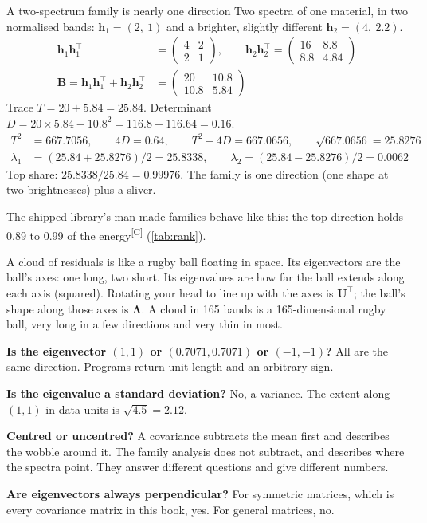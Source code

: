 \documentclass[11pt,a4paper,oneside,openany]{book}
\newcommand{\B}[1]{{\symbf{#1}}}
\newcommand{\B}[1]{{\bm{#1}}}
\newcommand{\comp}{\textsuperscript{\textsf{\scriptsize[C]}}}
\newcommand{\T}{^{\top}}
\newcommand{\vh}{\B{h}}
\newcommand{\mU}{\B{U}}
\newcommand{\mB}{\B{B}}
\newcommand{\mLam}{\B{\Lambda}}
\begin{document}
\begin{worked}[label=we:family]{A two-spectrum family is nearly one direction}
Two spectra of one material, in two normalised bands: $\vh_1=(2,\ 1)$ and a brighter, slightly different
$\vh_2=(4,\ 2.2)$.
\begin{align*}
\vh_1\vh_1\T &= \begin{pmatrix}4&2\\2&1\end{pmatrix},\qquad
\vh_2\vh_2\T = \begin{pmatrix}16&8.8\\8.8&4.84\end{pmatrix}\\
\mB=\vh_1\vh_1\T+\vh_2\vh_2\T &= \begin{pmatrix}20&10.8\\10.8&5.84\end{pmatrix}
\end{align*}
Trace $T=20+5.84=25.84$. Determinant $D=20\times5.84-10.8^2=116.8-116.64=0.16$.
\begin{align*}
T^2 &= 667.7056,\qquad 4D=0.64,\qquad T^2-4D=667.0656,\qquad \sqrt{667.0656}=25.8276\\
\lambda_1 &= (25.84+25.8276)/2=25.8338,\qquad \lambda_2=(25.84-25.8276)/2=0.0062
\end{align*}
Top share: $25.8338/25.84=0.99976$. The family is one direction (one shape at two brightnesses) plus a sliver.
\end{worked}

The shipped library's man-made families behave like this: the top direction holds 0.89 to 0.99 of the energy\comp
(\cref{tab:rank}).

\begin{analogy}
A cloud of residuals is like a rugby ball floating in space. Its eigenvectors are the ball's axes: one long, two short.
Its eigenvalues are how far the ball extends along each axis (squared). Rotating your head to line up with the axes is
$\mU\T$; the ball's shape along those axes is $\mLam$. A cloud in 165 bands is a 165-dimensional rugby ball, very long in a few
directions and very thin in most.
\end{analogy}

\begin{confusions}
\textbf{Is the eigenvector $(1,1)$ or $(0.7071,0.7071)$ or $(-1,-1)$?} All are the same direction. Programs return unit
length and an arbitrary sign.

\textbf{Is the eigenvalue a standard deviation?} No, a variance. The extent along $(1,1)$ in data units is
$\sqrt{4.5}=2.12$.

\textbf{Centred or uncentred?} A covariance subtracts the mean first and describes the wobble around it. The family analysis
does not subtract, and describes where the spectra point. They answer different questions and give different numbers.

\textbf{Are eigenvectors always perpendicular?} For symmetric matrices, which is every covariance matrix in this book, yes.
For general matrices, no.
\end{confusions}
\end{document}
